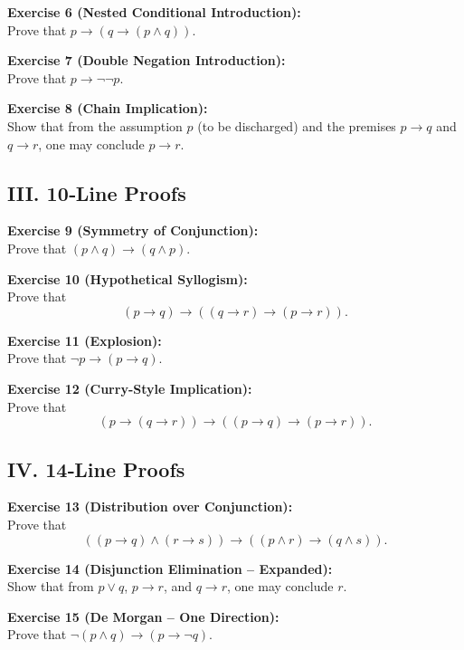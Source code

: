\documentclass[12pt]{article}
\begin{document}
\bigskip
\textbf{Exercise 6 (Nested Conditional Introduction):}\\[0.3em]
Prove that \(p\to (q\to (p\land q))\).


\bigskip
\textbf{Exercise 7 (Double Negation Introduction):}\\[0.3em]
Prove that \(p\to \lnot\lnot p\).


\bigskip
\textbf{Exercise 8 (Chain Implication):}\\[0.3em]
Show that from the assumption \(p\) (to be discharged) and the premises \(p\to q\) and \(q\to r\), one may conclude \(p\to r\).

\pagebreak
\subsection{III. 10‐Line Proofs}

\bigskip
\textbf{Exercise 9 (Symmetry of Conjunction):}\\[0.3em]
Prove that \((p\land q)\to (q\land p)\).


\bigskip
\textbf{Exercise 10 (Hypothetical Syllogism):}\\[0.3em]
Prove that 
\[
(p\to q)\to ((q\to r)\to (p\to r)).
\]


\bigskip
\textbf{Exercise 11 (Explosion):}\\[0.3em]
Prove that \(\lnot p\to (p\to q)\).


\bigskip
\textbf{Exercise 12 (Curry-Style Implication):}\\[0.3em]
Prove that 
\[
(p\to (q\to r))\to ((p\to q)\to (p\to r)).
\]

\pagebreak
\subsection{IV. 14‐Line Proofs}

\bigskip
\textbf{Exercise 13 (Distribution over Conjunction):}\\[0.3em]
Prove that 
\[
((p\to q)\land (r\to s))\to ((p\land r)\to (q\land s)).
\]


\bigskip
\textbf{Exercise 14 (Disjunction Elimination – Expanded):}\\[0.3em]
Show that from \(p\lor q\), \(p\to r\), and \(q\to r\), one may conclude \(r\).

\bigskip
\textbf{Exercise 15 (De Morgan – One Direction):}\\[0.3em]
Prove that \(\lnot(p\land q)\to (p\to \lnot q)\).
\end{document}
